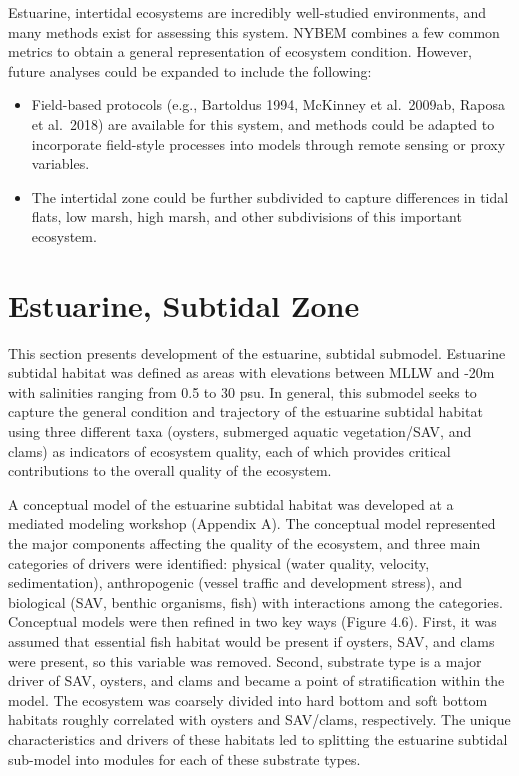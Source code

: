 \documentclass[
]{book}
\providecommand{\tightlist}{%
  \setlength{\itemsep}{0pt}\setlength{\parskip}{0pt}}
\begin{document}
Estuarine, intertidal ecosystems are incredibly well-studied environments, and many methods exist for assessing this system. NYBEM combines a few common metrics to obtain a general representation of ecosystem condition. However, future analyses could be expanded to include the following:

\begin{itemize}
\tightlist
\item
  Field-based protocols (e.g., Bartoldus 1994, McKinney et al.~2009ab, Raposa et al.~2018) are available for this system, and methods could be adapted to incorporate field-style processes into models through remote sensing or proxy variables.\\
\item
  The intertidal zone could be further subdivided to capture differences in tidal flats, low marsh, high marsh, and other subdivisions of this important ecosystem.
\end{itemize}

\hypertarget{estuarine-subtidal-zone}{%
\section{Estuarine, Subtidal Zone}\label{estuarine-subtidal-zone}}

This section presents development of the estuarine, subtidal submodel. Estuarine subtidal habitat was defined as areas with elevations between MLLW and -20m with salinities ranging from 0.5 to 30 psu. In general, this submodel seeks to capture the general condition and trajectory of the estuarine subtidal habitat using three different taxa (oysters, submerged aquatic vegetation/SAV, and clams) as indicators of ecosystem quality, each of which provides critical contributions to the overall quality of the ecosystem.

A conceptual model of the estuarine subtidal habitat was developed at a mediated modeling workshop (Appendix A). The conceptual model represented the major components affecting the quality of the ecosystem, and three main categories of drivers were identified: physical (water quality, velocity, sedimentation), anthropogenic (vessel traffic and development stress), and biological (SAV, benthic organisms, fish) with interactions among the categories. Conceptual models were then refined in two key ways (Figure 4.6). First, it was assumed that essential fish habitat would be present if oysters, SAV, and clams were present, so this variable was removed. Second, substrate type is a major driver of SAV, oysters, and clams and became a point of stratification within the model. The ecosystem was coarsely divided into hard bottom and soft bottom habitats roughly correlated with oysters and SAV/clams, respectively. The unique characteristics and drivers of these habitats led to splitting the estuarine subtidal sub-model into modules for each of these substrate types.
\end{document}
